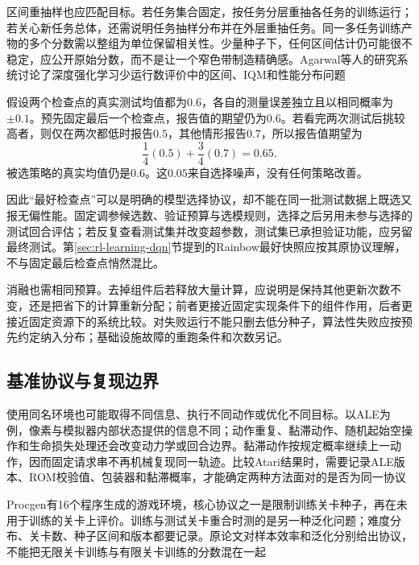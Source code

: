 区间重抽样也应匹配目标。若任务集合固定，按任务分层重抽各任务的训练运行；若关心新任务总体，还需说明任务抽样分布并在外层重抽任务。同一多任务训练产物的多个分数需以整组为单位保留相关性。少量种子下，任何区间估计仍可能很不稳定，应公开原始分数，而不是让一个窄色带制造精确感。Agarwal等人的研究系统讨论了深度强化学习少运行数评价中的区间、IQM和性能分布问题

\begin{example}[挑最好检查点造成的偏差]
  \label{ex:rl-learning-checkpoint-selection}
  假设两个检查点的真实测试均值都为$0.6$，各自的测量误差独立且以相同概率为$\pm0.1$。预先固定最后一个检查点，报告值的期望仍为$0.6$。若看完两次测试后挑较高者，则仅在两次都低时报告$0.5$，其他情形报告$0.7$，所以报告值期望为
  \[
    \frac14(0.5)+\frac34(0.7)=0.65.
  \]
  被选策略的真实均值仍是$0.6$。这$0.05$来自选择噪声，没有任何策略改善。
\end{example}

因此“最好检查点”可以是明确的模型选择协议，却不能在同一批测试数据上既选又报无偏性能。固定调参候选数、验证预算与选模规则，选择之后另用未参与选择的测试回合评估；若反复查看测试集并改变超参数，测试集已承担验证功能，应另留最终测试。第\ref{sec:rl-learning-dqn}节提到的Rainbow最好快照应按其原协议理解，不与固定最后检查点悄然混比。

消融也需相同预算。去掉组件后若释放大量计算，应说明是保持其他更新次数不变，还是把省下的计算重新分配；前者更接近固定实现条件下的组件作用，后者更接近固定资源下的系统比较。对失败运行不能只删去低分种子，算法性失败应按预先约定纳入分布；基础设施故障的重跑条件和次数另记。

\subsection{基准协议与复现边界}
\label{sec:rl-learning-benchmark-protocol}

使用同名环境也可能取得不同信息、执行不同动作或优化不同目标。以ALE为例，像素与模拟器内部状态提供的信息不同；动作重复、黏滞动作、随机起始空操作和生命损失处理还会改变动力学或回合边界。黏滞动作按规定概率继续上一动作，因而固定请求串不再机械复现同一轨迹。比较Atari结果时，需要记录ALE版本、ROM校验值、包装器和黏滞概率，才能确定两种方法面对的是否为同一协议

Procgen有16个程序生成的游戏环境，核心协议之一是限制训练关卡种子，再在未用于训练的关卡上评价。训练与测试关卡重合时测的是另一种泛化问题；难度分布、关卡数、种子区间和版本都要记录。原论文对样本效率和泛化分别给出协议，不能把无限关卡训练与有限关卡训练的分数混在一起

